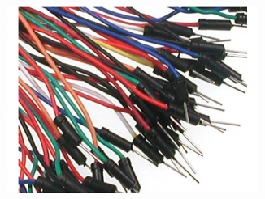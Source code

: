 \begin{frame}
\begin{columns}
    \includegraphics[height=0.15\textheight]{common/jumper-wires.jpg}
  \end{columns}
\end{frame}
